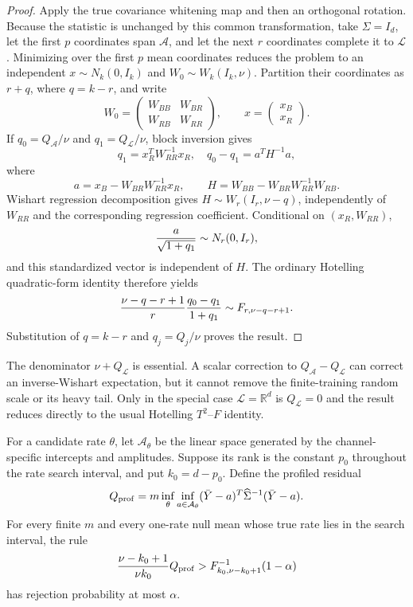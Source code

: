 \begin{proof}
Apply the true covariance whitening map and then an orthogonal rotation.
Because the statistic is unchanged by this common transformation, take
$\Sigma=I_d$, let the first $p$ coordinates span $\mathcal A$, and let the
next $r$ coordinates complete it to $\mathcal L$.  Minimizing over the first
$p$ mean coordinates reduces the problem to an independent
$x\sim N_k(0,I_k)$ and $W_0\sim W_k(I_k,\nu)$.  Partition their coordinates
as $r+q$, where $q=k-r$, and write
\[
 W_0=\begin{pmatrix}W_{BB}&W_{BR}\\W_{RB}&W_{RR}\end{pmatrix},
 \qquad x=\begin{pmatrix}x_B\\x_R\end{pmatrix}.
\]
If $q_0=Q_{\mathcal A}/\nu$ and
$q_1=Q_{\mathcal L}/\nu$, block inversion gives
\[
 q_1=x_R^TW_{RR}^{-1}x_R,
 \quad
 q_0-q_1=a^TH^{-1}a,
\]
where
\[
 a=x_B-W_{BR}W_{RR}^{-1}x_R,
 \qquad
 H=W_{BB}-W_{BR}W_{RR}^{-1}W_{RB}.
\]
Wishart regression decomposition gives
$H\sim W_r(I_r,\nu-q)$, independently of $W_{RR}$ and the corresponding
regression coefficient.  Conditional on $(x_R,W_{RR})$,
\[
 {a\over\sqrt{1+q_1}}\sim N_r(0,I_r),
\]
and this standardized vector is independent of $H$.  The ordinary
Hotelling quadratic-form identity therefore yields
\[
 {\nu-q-r+1\over r}{q_0-q_1\over1+q_1}
 \sim F_{r,\nu-q-r+1}.
\]
Substitution of $q=k-r$ and $q_j=Q_j/\nu$ proves the result.
\end{proof}

The denominator $\nu+Q_{\mathcal L}$ is essential.  A scalar correction to
$Q_{\mathcal A}-Q_{\mathcal L}$ can correct an inverse-Wishart expectation,
but it cannot remove the finite-training random scale or its heavy tail.
Only in the special case $\mathcal L=\mathbb R^d$ is
$Q_{\mathcal L}=0$ and the result reduces directly to the usual Hotelling
$T^2$--$F$ identity.

\begin{proposition}
\label{prop:finite-training-omnibus}
For a candidate rate $\theta$, let $\mathcal A_\theta$ be the linear space
generated by the channel-specific intercepts and amplitudes.  Suppose its
rank is the constant $p_0$ throughout the rate search interval, and put
$k_0=d-p_0$.  Define the profiled residual
\[
 Q_{\rm prof}=m\inf_{\theta}\inf_{a\in\mathcal A_\theta}
  (\bar Y-a)^T\widehat\Sigma^{-1}(\bar Y-a).
\]
For every finite $m$ and every one-rate null mean whose true rate lies in the
search interval, the rule
\[
 {\nu-k_0+1\over \nu k_0}Q_{\rm prof}
 >F^{-1}_{k_0,\nu-k_0+1}(1-\alpha)
\]
has rejection probability at most $\alpha$.
\end{proposition}

